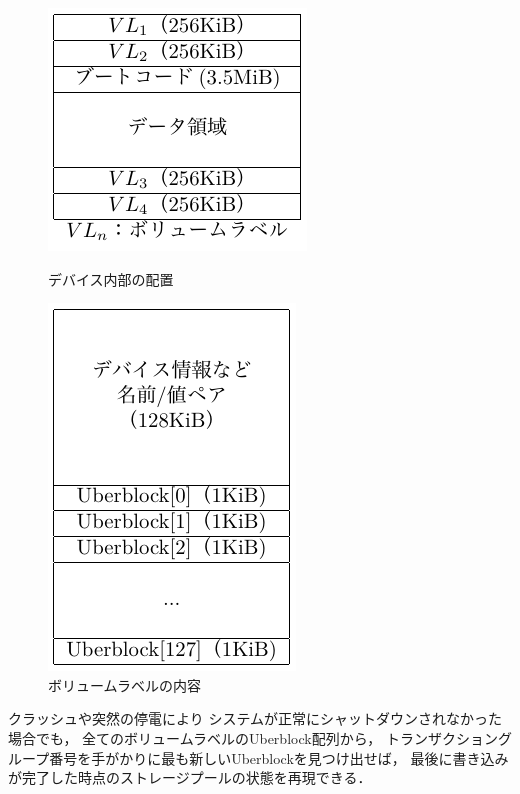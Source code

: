 \begin{figure}[btp]
  \centering
  \begin{minipage}{0.4\columnwidth}
    \centering\includegraphics[scale=1.0]{Fig/zfsDevice.pdf}
    \caption{デバイス内部の配置}
    \label{fig:zfsDevice}
  \end{minipage}
  \begin{minipage}{0.4\columnwidth}
    \centering\includegraphics[scale=1.0]{Fig/zfsVolumeLabel.pdf}
    \caption{ボリュームラベルの内容}
    \label{fig:zfsVolumeLabel}
  \end{minipage}
\end{figure}

クラッシュや突然の停電により
システムが正常にシャットダウンされなかった場合でも，
全てのボリュームラベルのUberblock配列から，
トランザクショングループ番号を手がかりに最も新しいUberblockを見つけ出せば，
最後に書き込みが完了した時点のストレージプールの状態を再現できる．


